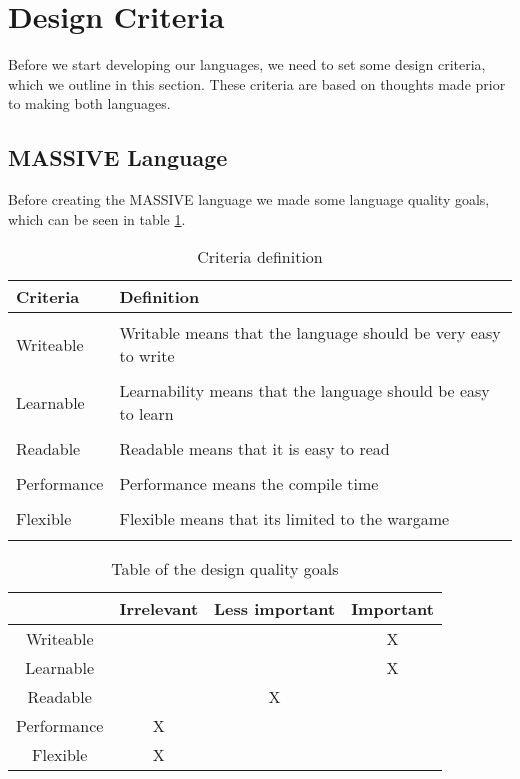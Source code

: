 \section{Design Criteria}
\label{sec:designcrit}
Before we start developing our languages, we need to set some design criteria, which we outline in this section. These criteria are based on thoughts made prior to making both languages.

\subsection{MASSIVE Language}
Before creating the MASSIVE language we made some language quality goals, which can be seen in table \ref{table:priorities}.


\begin{table}[H]
\caption{Criteria definition} %
\centering %
\begin{tabular}{ll} %
 \textbf{Criteria} & \textbf{Definition} \\
\hline \\
  Writeable&Writable means that the language should be very easy to write \\ \\
	Learnable&Learnability means that the language should be easy to learn\\ \\
	Readable&Readable means that it is easy to read\\ \\
	Performance&Performance means the compile time\\ \\
	Flexible&Flexible means that its limited to the wargame\\ \\
	\end{tabular}
\end{table}
\begin{table}[H]
\caption{Table of the design quality goals} %
\centering %
\begin{tabular}{cccc} %
\hline\hline %
 & Irrelevant & Less important & Important \\ [0.5ex] %
\hline %
Writeable &  &  & X\\ %
Learnable &  &  & X\\
Readable &  & X & \\
Performance & X &  & \\
Flexible & X &  & \\ [1ex] %
\hline %
\end{tabular} 
\label{table:priorities} %
\end{table}

